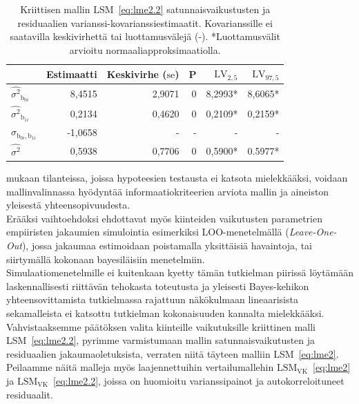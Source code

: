 \documentclass[finnish]{docopts}
\begin{document}
\begin{table}[H]
\centering
\begin{tabular}{lrrrrr}
\toprule
  & Estimaatti & Keskivirhe ($\text{se}$) & P & $\text{LV}_{2,5}$ & $\text{LV}_{97,5}$\\
\midrule
$\hat{\sigma^2}_{\text{b}_{0i}}$ & 8,4515 & 2,9071 & 0 & 8,2993* & 8,6065* \\
$\hat{\sigma^2}_{\text{b}_{1i}}$ & 0,2134 & 0,4620 & 0 & 0,2109* & 0,2159* \\
$\hat{\sigma}_{\text{b}_{0i}, \text{b}_{1i}}$ & -1,0658 & - & - & - & - \\
\addlinespace
$\hat{\sigma^2}$ & 0,5938 & 0,7706 & 0 & 0,5900* & 0.5977* \\
\bottomrule
\end{tabular}
\caption{Kriittisen mallin $\text{LSM}$~\ref{eq:lme2.2} satunnaisvaikustusten ja residuaalien varianssi-kovarianssiestimaatit. Kovarianssille ei saatavilla keskivirhettä tai luottamusvälejä (-). *Luottamusvälit arvioitu normaaliapproksimaatiolla.}
\label{table:lme2.2rand}
\end{table}

\cite{burzykowski13} mukaan tilanteissa, joissa hypoteesien testausta ei katsota mielekkääksi, voidaan mallinvalinnassa hyödyntää informaatiokriteerien arviota mallin ja aineiston yleisestä yhteensopivuudesta.\\ 

Erääksi vaihtoehdoksi \cite{burzykowski13} ehdottavat myös kiinteiden vaikutusten parametrien empiiristen jakaumien simulointia esimerkiksi LOO-menetelmällä (\textit{Leave-One-Out}), jossa jakaumaa estimoidaan poistamalla yksittäisiä havaintoja, tai siirtymällä kokonaan bayesiläisiin menetelmiin.\\

Simulaatiomenetelmille ei kuitenkaan kyetty tämän tutkielman piirissä löytämään laskennallisesti riittävän tehokasta toteutusta ja yleisesti Bayes-kehikon yhteensovittamista tutkielmassa rajattuun näkökulmaan lineaarisista sekamalleista ei katsottu tutkielman kokonaisuuden kannalta mielekkääksi.\\ 

Vahvistaaksemme päätöksen valita kiinteille vaikutuksille kriittinen malli LSM~\ref{eq:lme2.2}, pyrimme varmistumaan mallin satunnaisvaikutusten ja residuaalien jakaumaoletuksista, verraten niitä täyteen malliin LSM~\ref{eq:lme2}. Peilaamme näitä malleja myös laajennettuihin vertailumallehin $\text{LSM}_{\text{VK}}$~\ref{eq:lme2} ja $\text{LSM}_{\text{VK}}$~\ref{eq:lme2.2}, joissa on huomioitu varianssipainot ja autokorreloituneet residuaalit.\\
\end{document}
